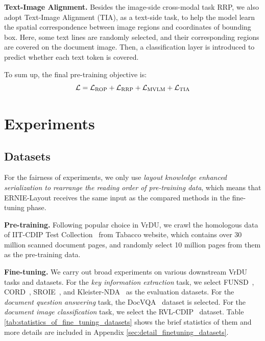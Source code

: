 \documentclass[11pt]{article}
\begin{document}
\noindent\textbf{Text-Image Alignment.} 
Besides the image-side cross-modal task RRP, we also adopt Text-Image Alignment (TIA), as a text-side task, to help the model learn the spatial correspondence between image regions and coordinates of bounding box.
Here, some text lines are randomly selected, and their corresponding regions are covered on the document image.
Then, a classification layer is introduced to predict whether each text token is covered.

To sum up, the final pre-training objective is:
%
\begin{equation}
\mathcal{L} = \mathcal{L}_{\rm ROP} + \mathcal{L}_{\rm RRP} + \mathcal{L}_{\rm MVLM} + \mathcal{L}_{\rm TIA}
\end{equation}




\section{Experiments}

\subsection{Datasets}

For the fairness of experiments, we only use \emph{layout knowledge enhanced serialization to rearrange the reading order of pre-training data}, which means that ERNIE-Layout receives the same input as the compared methods in the fine-tuning phase.

\noindent\textbf{Pre-training.}
Following popular choice in VrDU, we crawl the homologous data of IIT-CDIP Test Collection~\cite{lewis2006building} from Tabacco website, which contains over 30 million scanned document pages, and randomly select 10 million pages from them as the pre-training data. 

\noindent\textbf{Fine-tuning.}
We carry out broad experiments on various downstream VrDU tasks and datasets.
For the \emph{key information extraction} task, we select FUNSD~\cite{jain2019multimodal}, CORD~\cite{park2019cord}, SROIE~\cite{huang2019icdar2019}, and Kleister-NDA~\cite{gralinski2021kleister} as the evaluation datasets.
For the \emph{document question answering} task, the DocVQA~\cite{mathew2021docvqa} dataset is selected.
For the \emph{document image classification} task, we select the RVL-CDIP~\cite{harley2015evaluation} dataset.
Table \ref{tab:statistics_of_fine_tuning_datasets} shows the brief statistics of them and more details are included in Appendix \ref{sec:detail_finetuning_datasets}.
\end{document}
